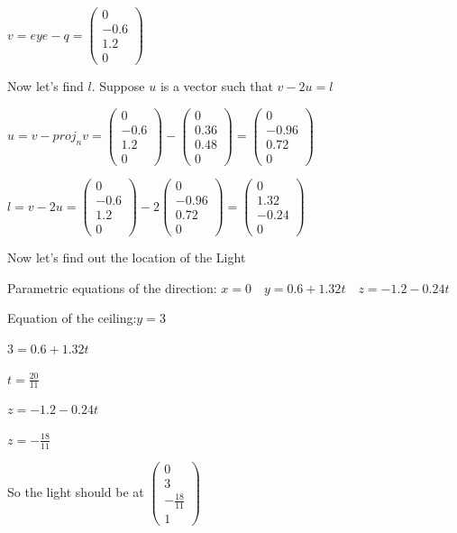 \documentclass[12pt]{article}
\begin{document}
$v = eye - q = \begin{pmatrix}0 \\-0.6\\1.2\\0\end{pmatrix}$

Now let's find $l$. Suppose $u$ is a vector such that $v - 2u = l$

$u = v - proj_n v = \begin{pmatrix}0 \\-0.6\\1.2\\0\end{pmatrix}- \begin{pmatrix}0\\0.36\\0.48\\0\end{pmatrix} =\begin{pmatrix}0\\-0.96\\0.72\\0\end{pmatrix}$


$l = v-2u=\begin{pmatrix}0 \\-0.6\\1.2\\0\end{pmatrix}-2\begin{pmatrix}0 \\-0.96\\0.72\\0\end{pmatrix}=\begin{pmatrix}0 \\1.32\\-0.24\\0\end{pmatrix}$

Now let's find out the location of the Light

Parametric equations of the direction: $x=0 \quad y=0.6+1.32t \quad z=-1.2-0.24t$

Equation of the ceiling:$y=3$

$3=0.6+1.32t$

$t=\frac{20}{11}$

$z=-1.2 - 0.24t$

$z=-\frac{18}{11}$

So the light should be at $\begin{pmatrix}0\\3\\-\frac{18}{11}\\1\end{pmatrix}$
\end{document}

